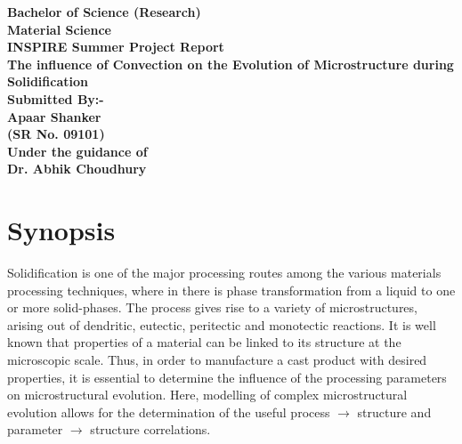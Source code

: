 \documentclass[a4paper]{report}
\begin{document}
\begin{titlepage}
\centering
\vspace{20pt}
\Large
\bfseries
Bachelor of Science (Research)\\
Material Science\\
\normalfont
\Large
\vspace{10pt}
INSPIRE Summer Project Report\\
\vspace{100pt}
\LARGE
\bfseries
The influence of Convection on the Evolution of Microstructure 
during Solidification\\
\normalfont
\Large
\vspace{100pt}
Submitted By:-\\
Apaar Shanker\\
(SR No. 09101)\\
\vspace{20pt}
Under the guidance of\\ 
Dr. Abhik Choudhury
\end{titlepage}

{}
\tableofcontents



\chapter{Synopsis}

Solidification is one of the major processing routes among the various materials processing 
techniques, where in there is phase transformation from a liquid to one or more solid-phases. 
The process gives rise to a variety of microstructures, arising out of dendritic, eutectic, peritectic and
monotectic reactions. It is well known that properties of a material can be linked to its structure
at the microscopic scale. Thus, in order to manufacture a cast product with desired properties, it is 
essential to determine the influence of the processing parameters on microstructural evolution.
Here, modelling of complex microstructural evolution allows for the determination of 
the useful process $\rightarrow$ structure and parameter $\rightarrow$ structure correlations.\\
\end{document}

